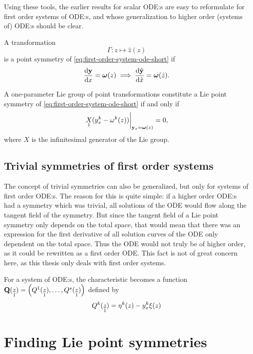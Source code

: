 Using these tools, the earlier results for scalar ODE:s are easy to reformulate for first order systems of ODE:s, and whose generalization to higher order (systems of) ODE:s should be clear.
\begin{defn} \label{defn:general-symmetry}
  A transformation 
  \begin{equation}
    \Gamma: z \mapsto \hat{z}(z)
  \end{equation}
  is a point symmetry of \cref{eq:first-order-system-ode-short} if
  \begin{equation}
    \diff{\vb{y}}{x} = \vb*{\omega}(z)
    \implies
    \diff{\hat{\vb{y}}}{\hat{x}} = \vb*{\omega}(\hat{z}).
  \end{equation}
\end{defn}
\begin{thm} \label{thm:linearized-general-symmetry}
  A one-parameter Lie group of point transformations constitute a Lie point symmetry of \cref{eq:first-order-system-ode-short} if and only if
  \begin{equation}
    \eval{\prolong{X}{1}(y^k_x - \omega^k(z))}_{\vb{y}_x = \vb*{\omega}(z)} = 0,
  \end{equation}
  where \(X\) is the infinitesimal generator of the Lie group.
\end{thm}

\subsection{Trivial symmetries of first order systems}

The concept of trivial symmetries can also be generalized, but only for systems of first order ODE:s.
The reason for this is quite simple: if a higher order ODE:s had a symmetry which was trivial, all solutions of the ODE would flow along the tangent field of the symmetry.
But since the tangent field of a Lie point symmetry only depends on the total space, that would mean that there was an expression for the first derivative of all solution curves of the ODE only dependent on the total space.
Thus the ODE would not truly be of higher order, as it could be rewritten as a first order ODE.
This fact is not of great concern here, as this thesis only deals with first order systems.

For a system of ODE:s, the characteristic becomes a function \(\vb{Q}(\prolong{z}{1}) = \qty(Q^1(\prolong{z}{1}), \dots, Q^s(\prolong{z}{1}))\) defined by
\begin{equation}
  Q^k(\prolong{z}{1}) = \eta^k(z) - y^k_x \xi(z)
\end{equation}
\begin{defn} \label{defn:trivial-symmetry}
\end{defn}

\section{Finding Lie point symmetries}

